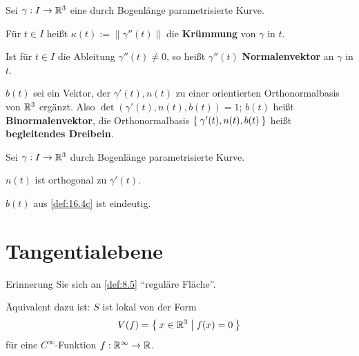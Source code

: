 \begin{definition}%
    Sei $\gamma: I \rightarrow \mathbb{R}^3$ eine durch Bogenlänge parametrisierte
    Kurve.

    \begin{defenum}
        \item Für $t \in I$ heißt $\kappa(t) := \|\gamma''(t)\|$ die
              \textbf{Krümmung} von $\gamma$ in $t$.
        \item Ist für $t \in I$ die Ableitung $\gamma''(t) \neq 0$,
              so heißt $\gamma''(t)$ \textbf{Normalenvektor}
              an $\gamma$ in $t$.
        \item \label{def:16.4c} $b(t)$ sei ein Vektor, der $\gamma'(t), n(t)$
              zu einer orientierten Orthonormalbasis von $\mathbb{R}^3$ ergänzt.
              Also $\det(\gamma'(t), n(t), b(t)) = 1$;
              $b(t)$ heißt \textbf{Binormalenvektor},
              die Orthonormalbasis $\Set{\gamma'(t), n(t), b(t)}$
              heißt \textbf{begleitendes Dreibein}.
    \end{defenum}
\end{definition}

\begin{bemerkung}%
    Sei $\gamma: I \rightarrow \mathbb{R}^3$ durch Bogenlänge parametrisierte
    Kurve.

    \begin{bemenum}
        \item $n(t)$ ist orthogonal zu $\gamma'(t)$.
        \item $b(t)$ aus \cref{def:16.4c} ist eindeutig.
    \end{bemenum}
\end{bemerkung}

\section{Tangentialebene}
Erinnerung Sie sich an \cref{def:8.5} \enquote{reguläre Fläche}.

Äquivalent dazu ist: $S$ ist lokal von der Form
\[V(f) = \Set{x \in \ensuremath{\mathbb{R}}^3 | f(x) = 0 }\]
für eine $C^\infty$-Funktion $f: \mathbb{R}^\infty \rightarrow \mathbb{R}$.

